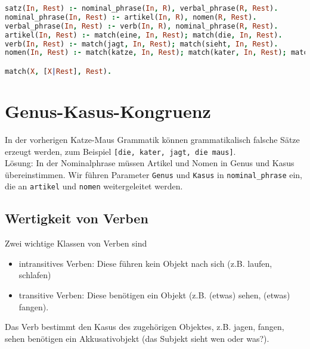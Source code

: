  $ $
\begin{lstlisting}[language=Prolog]
satz(In, Rest) :- nominal_phrase(In, R), verbal_phrase(R, Rest).
nominal_phrase(In, Rest) :- artikel(In, R), nomen(R, Rest).
verbal_phrase(In, Rest) :- verb(In, R), nominal_phrase(R, Rest).
artikel(In, Rest) :- match(eine, In, Rest); match(die, In, Rest).
verb(In, Rest) :- match(jagt, In, Rest); match(sieht, In, Rest).
nomen(In, Rest) :- match(katze, In, Rest); match(kater, In, Rest); match(maus, In, Rest).

match(X, [X|Rest], Rest).
\end{lstlisting}

\section{Genus-Kasus-Kongruenz}
In der vorherigen Katze-Maus Grammatik können grammatikalisch falsche Sätze erzeugt werden, zum Beispiel \lstinline`[die, kater, jagt, die maus]`.\\
Lösung: In der Nominalphrase müssen Artikel und Nomen in Genus und Kasus übereinstimmen. Wir führen Parameter \lstinline`Genus` und \lstinline`Kasus` in \lstinline`nominal_phrase` ein, die an \lstinline`artikel` und \lstinline`nomen` weitergeleitet werden. 

\subsection{Wertigkeit von Verben}
Zwei wichtige Klassen von Verben sind
\begin{itemize}
\item intransitives Verben: Diese führen kein Objekt nach sich (z.B. laufen, schlafen)
\item transitive Verben: Diese benötigen ein Objekt (z.B. (etwas) sehen, (etwas) fangen).
\end{itemize}
Das Verb bestimmt den Kasus des zugehörigen Objektes, z.B. jagen, fangen, sehen benötigen ein Akkusativobjekt (das Subjekt sieht wen oder was?).

